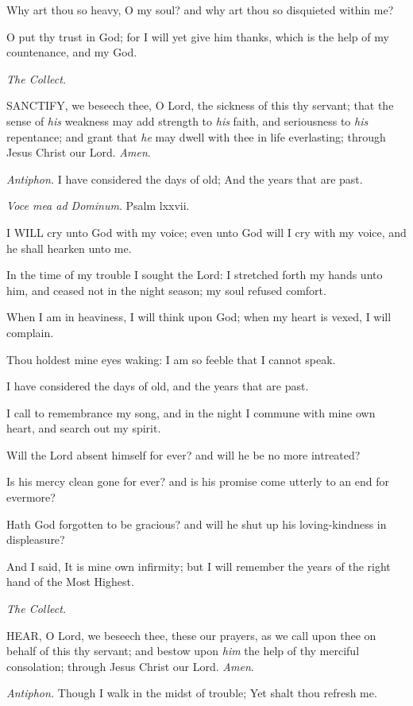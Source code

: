 Why art thou so heavy, O my soul? and why art thou
so disquieted within me?

O put thy trust in God; for I will yet give him thanks,
which is the help of my countenance, and my God.

\emph{The
Collect.}

SANCTIFY,
we beseech thee, O Lord, the sickness of this thy servant; that the
sense of \emph{his} weakness may add strength to \emph{his} faith,
and seriousness to \emph{his} repentance; and grant that \emph{he}
may dwell with thee in life everlasting; through Jesus Christ our Lord.
\emph{Amen}.

\emph{Antiphon.} I have considered the days of old; And the years
that are past.

\emph{Voce
mea ad Dominum}. Psalm lxxvii.

I
WILL cry unto God with my voice; even unto God will I cry with my voice,
and he shall hearken unto me.

In the time of my trouble I sought the Lord: I stretched
forth my hands unto him, and ceased not in the night season; my soul
refused comfort.

When I am in heaviness, I will think upon God; when
my heart is vexed, I will complain.

Thou holdest mine eyes waking: I am so feeble that
I cannot speak.

I have considered the days of old, and the years
that are past.

I call to remembrance my song, and in the night I
commune with mine own heart, and search out my spirit.

Will the Lord absent himself for ever? and will he
be no more intreated?

Is his mercy clean gone for ever? and is his promise
come utterly to an end for evermore?

Hath God forgotten to be gracious? and will he shut
up his loving-kindness in displeasure?

And I said, It is mine own infirmity; but I will
remember the years of the right hand of the Most Highest.

\emph{The
Collect.}

HEAR,
O Lord, we beseech thee, these our prayers, as we call upon thee on
behalf of this thy servant; and bestow upon \emph{him} the help of
thy merciful consolation; through Jesus Christ our Lord. \emph{Amen}.

\emph{Antiphon.} Though I walk in the midst of trouble; Yet shalt
thou refresh me.

